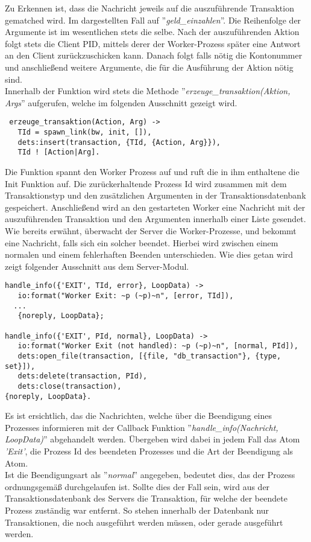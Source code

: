 Zu Erkennen ist, dass die Nachricht jeweils auf die auszuführende Transaktion gematched wird. Im dargestellten Fall auf ''\textit{geld\_einzahlen}''. Die Reihenfolge der Argumente ist im wesentlichen stets die selbe. Nach der auszuführenden Aktion folgt stets die Client PID, mittels derer der Worker-Prozess später eine Antwort an den Client zurückzuschicken kann. Danach folgt falls nötig die Kontonummer und anschließend weitere Argumente, die für die Ausführung der Aktion nötig sind.\\
Innerhalb der Funktion wird stets die Methode ''\textit{erzeuge\_transaktion(Aktion, Args}'' aufgerufen, welche im folgenden Ausschnitt gezeigt wird.
\begin{lstlisting}
 erzeuge_transaktion(Action, Arg) ->
   TId = spawn_link(bw, init, []),
   dets:insert(transaction, {TId, {Action, Arg}}),
   TId ! [Action|Arg].
\end{lstlisting}
Die Funktion spannt den Worker Prozess auf und ruft die in ihm enthaltene die Init Funktion auf. Die zurückerhaltende Prozess Id wird zusammen mit dem Transaktionstyp und den zusätzlichen Argumenten in der Transaktionsdatenbank gespeichert. Anschließend wird an den gestarteten Worker eine Nachricht mit der auszuführenden Transaktion und den Argumenten innerhalb einer Liste gesendet.\\
Wie bereits erwähnt, überwacht der Server die Worker-Prozesse, und bekommt eine Nachricht, falls sich ein solcher beendet. Hierbei wird zwischen einem normalen und einem fehlerhaften Beenden unterschieden. Wie dies getan wird zeigt folgender Ausschnitt aus dem Server-Modul.
\begin{lstlisting}
handle_info({'EXIT', TId, error}, LoopData) -> 
   io:format("Worker Exit: ~p (~p)~n", [error, TId]),
  ...
   {noreply, LoopData};

handle_info({'EXIT', PId, normal}, LoopData) -> 
   io:format("Worker Exit (not handled): ~p (~p)~n", [normal, PId]),
   dets:open_file(transaction, [{file, "db_transaction"}, {type, set}]),
   dets:delete(transaction, PId),
   dets:close(transaction),
{noreply, LoopData}.
\end{lstlisting}
Es ist ersichtlich, das die Nachrichten, welche über die Beendigung eines Prozesses informieren mit der Callback Funktion ''\textit{handle\_info(Nachricht, LoopData)}'' abgehandelt werden. Übergeben wird dabei in jedem Fall das Atom \textit{'Exit'}, die Prozess Id des beendeten Prozesses und die Art der Beendigung als Atom.\\
Ist die Beendigungsart als ''\textit{normal}'' angegeben, bedeutet dies, das der Prozess ordnungsgemäß durchgelaufen ist. Sollte dies der Fall sein, wird aus der Transaktionsdatenbank des Servers die Transaktion, für welche der beendete Prozess zuständig war entfernt. So stehen innerhalb der Datenbank nur Transaktionen, die noch ausgeführt werden müssen, oder gerade ausgeführt werden.\\
